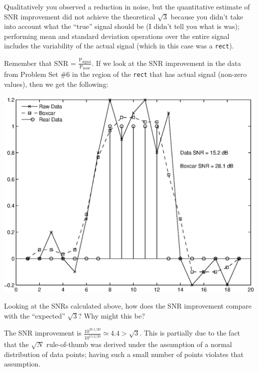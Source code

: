 

Qualitatively you observed a reduction in noise, but the quantitative estimate
of SNR improvement did not achieve the theoretical $\sqrt{3}$ because you
didn't take into account what the ``true'' signal should be (I didn't tell you
what is was); performing mean and standard deviation operations over the entire
signal includes the variability of the actual signal (which in this case was a
\verb+rect+).

Remember that SNR =
$\frac{\textrm{P}_{\textrm{signal}}}{\textrm{P}_{\textrm{noise}}}$.  If we look
at the SNR improvement in the data from Problem Set \#6 in the region of the
\verb+rect+ that has actual signal (non-zero values), then we get the
following:

\begin{center}
\includegraphics[width=0.5\linewidth]{boxcar_averager/sliding_average.eps}
\end{center}

Looking at the SNRs calculated above, how does the SNR improvement compare with
the ``expected'' $\sqrt{3}$?  Why might this be?

The SNR improvement is $\frac{10^{28.1/20}}{10^{15.2/20}} \simeq 4.4 >
\sqrt{3}$.  This is partially due to the fact that the $\sqrt{N}$ rule-of-thumb
was derived under the assumption of a normal distribution of data points;
having such a small number of points violates that assumption.\\

